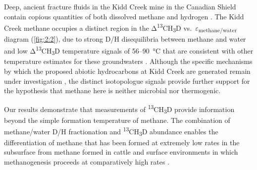 Deep, ancient fracture fluids in the Kidd Creek mine in the Canadian
Shield \parencite{Holland++_2013_N} contain copious quantities of both dissolved methane
and hydrogen \parencite{SherwoodLollar++_2002_N}. The Kidd Creek methane occupies a distinct
region in the Δ\textsuperscript{13}CH\textsubscript{3}D vs.\ $\varepsilon$\textsubscript{methane/water} diagram (\autoref{fig:2:2}), due to strong D/H
disequilibria between methane and water \parencite{SherwoodLollar++_2008_GCA} and low
Δ\textsuperscript{13}CH\textsubscript{3}D temperature signals of 56--90~°C that are consistent with other temperature estimates for these
groundwaters \parencite{SherwoodLollar++_2008_GCA}. Although the specific mechanisms by which the
proposed abiotic hydrocarbons at Kidd Creek are generated remain under
investigation \parencite{SherwoodLollar++_2002_N,SherwoodLollar++_2014_N}, the distinct isotopologue signals
provide further support for the hypothesis that methane here is neither
microbial nor thermogenic.

Our results demonstrate that measurements of
\textsuperscript{13}CH\textsubscript{3}D provide information beyond the
simple formation temperature of methane. The combination of methane/water
D/H fractionation and
\textsuperscript{13}CH\textsubscript{3}D abundance enables the
differentiation of methane that has been formed at extremely low rates
in the subsurface \parencite{Pohlman++_2009_EPSL,Bates++_2011_CG,Holler++_2011_PNAS} from methane formed
in cattle and surface environments in which methanogenesis proceeds at
comparatively high rates \parencite{Johnson+Johnson_1995_JAnimalSci,Varadharajan+Hemond_2012_JGR}.


